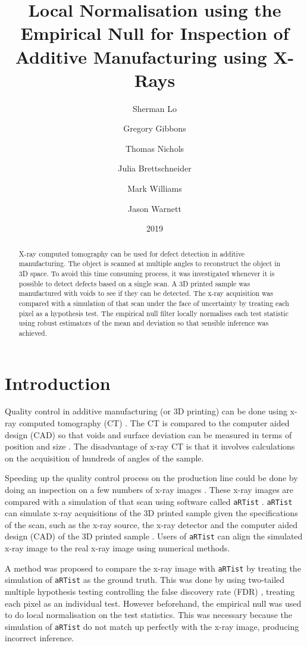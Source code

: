\documentclass{proc}
\title{Local Normalisation using the Empirical Null for Inspection of Additive Manufacturing using X-Rays}
\date{2019}
\author{
  Sherman Lo \and Gregory Gibbons \and Thomas Nichols \and Julia Brettschneider \and Mark Williams \and Jason Warnett
}
\begin{document}
\sloppy

\maketitle

\begin{abstract}
X-ray computed tomography can be used for defect detection in additive manufacturing. The object is scanned at multiple angles to reconstruct the object in 3D space. To avoid this time consuming process, it was investigated whenever it is possible to detect defects based on a single scan. A 3D printed sample was manufactured with voids to see if they can be detected. The x-ray acquisition was compared with a simulation of that scan under the face of uncertainty by treating each pixel as a hypothesis test. The empirical null filter locally normalises each test statistic using robust estimators of the mean and deviation so that sensible inference was achieved.
\end{abstract}

\section{Introduction}

Quality control in additive manufacturing (or 3D printing) can be done using x-ray computed tomography (CT) \citep{thompson2016x}. The CT is compared to the computer aided design (CAD) so that voids and surface deviation can be measured in terms of position and size \citep{villarraga2015assessing, lee2015compliance, kim2016inspection}. The disadvantage of x-ray CT is that it involves calculations on the acquisition of hundreds of angles of the sample.

Speeding up the quality control process on the production line could be done by doing an inspection on a few numbers of x-ray images \citep{warnett2016towards}. These x-ray images are compared with a simulation of that scan using software called \texttt{aRTist} \citep{bellon2007artist, jaenisch2008artist, bellon2012radiographic}. \texttt{aRTist} can simulate x-ray acquisitions of the 3D printed sample given the specifications of the scan, such as the x-ray source, the x-ray detector and the computer aided design (CAD) of the 3D printed sample \citep{bellon2011simulation, deresch2012simulating}. Users of \texttt{aRTist} can align the simulated x-ray image to the real x-ray image using numerical methods.

A method was proposed to compare the x-ray image with \texttt{aRTist} by treating the simulation of \texttt{aRTist} as the ground truth. This was done by using two-tailed multiple hypothesis testing \citep{pearson1900on, neyman1933on, fisher1970statistical} controlling the false discovery rate (FDR) \citep{benjamini1995controlling, benjamini2010discovering}, treating each pixel as an individual test. However beforehand, the empirical null \citep{efron2004large} was used to do local normalisation on the test statistics. This was necessary because the simulation of \texttt{aRTist} do not match up perfectly with the x-ray image, producing incorrect inference.
\end{document}
